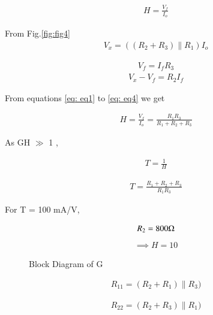 \begin{enumerate}[label=\arabic*.,ref=\theenumi]
\begin{align}
H = \frac{V_f}{I_o}
\label{eq: eq1}
\end{align}

From Fig.\ref{fig:fig4}
\begin{align}
    V_x = ((R_2 + R_3) \| R_1) I_o 
    \label{eq: eq2}
\end{align} 

\begin{align}
V_f = I_f R_3
\label{eq: eq3}
\end{align} 
\begin{align}
V_x - V_f = R_2 I_f
\label{eq: eq4}
\end{align} 

From equations \ref{eq: eq1} to \ref{eq: eq4} we get

\begin{align}
    H = \frac{V_f}{I_o}=\frac{R_1 R_3}{R_1+R_2+R_3}
    \label{eq:eq5}
\end{align}

As GH $\gg$ 1 ,


\begin{align}
    T = \frac{1}{H}
    \label{eq:eq6}
\end{align}


\begin{align}
    T = \frac{R_1+R_2+R_3}{R_1 R_3}
    \label{eq:eq6}
\end{align}

For T = 100 mA/V,

\begin{align}
    R_2 = 800 \ohm
    \label{eq:eq7}
\end{align}
\begin{align}
\implies H=10
\end{align}



\begin{figure}[!ht]
	\begin{center}
		\resizebox{\columnwidth}{!}{}
	\end{center}
\caption{Block Diagram of G}
\label{fig:fig6}
\end{figure}



\begin{align}
    R_{11} = (R_2+R_1)\|R_3)
\end{align}

\begin{align}
    R_{22} = (R_2+R_3)\|R_1)
\end{align}



\end{enumerate}
